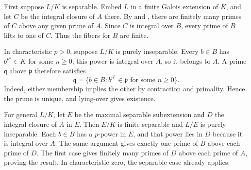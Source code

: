 First suppose $L/K$ is separable. Embed $L$ in a finite Galois extension of $K$, and let $C$ be the integral closure of $A$ there. By  and , there are finitely many primes of $C$ above any given prime of $A$. Since $C$ is integral over $B$, every prime of $B$ lifts to one of $C$. Thus the fibers for $B$ are finite.

In characteristic $p>0$, suppose $L/K$ is purely inseparable. Every $b\in B$ has $b^{p^n}\in K$ for some $n\geq0$; this power is integral over $A$, so it belongs to $A$. A prime $\mathfrak{q}$ above $\mathfrak{p}$ therefore satisfies
\[\mathfrak{q}=\{b\in B:b^{p^n}\in\mathfrak{p}\text{ for some }n\geq0\}.\]
Indeed, either membership implies the other by contraction and primality. Hence the prime is unique, and lying-over gives existence.

For general $L/K$, let $E$ be the maximal separable subextension and $D$ the integral closure of $A$ in $E$. Then $E/K$ is finite separable and $L/E$ is purely inseparable. Each $b\in B$ has a $p$-power in $E$, and that power lies in $D$ because it is integral over $A$. The same argument gives exactly one prime of $B$ above each prime of $D$. The first case gives finitely many primes of $D$ above each prime of $A$, proving the result. In characteristic zero, the separable case already applies.
